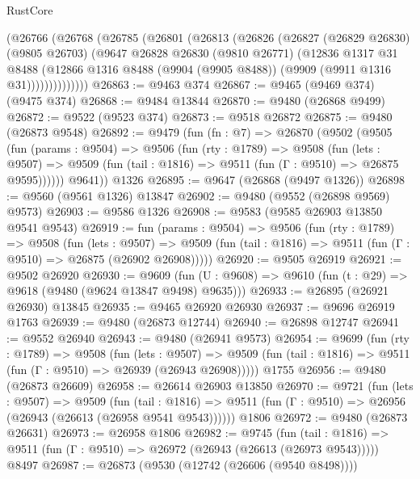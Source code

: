 \begin{lexlean}{RustCore}
\begin{coremodule}
        (@26766
          (@26768
            (@26785
              (@26801
                (@26813
                  (@26826
                    (@26827
                      (@26829 @26830)
                      (@9805 @26703)
                      (@9647
                        @26828
                        @26830
                        (@9810 @26771)
                        (@12836
                          @1317
                          @31
                          @8488
                          (@12866
                            @1316
                            @8488
                            (@9904 (@9905 @8488))
                            (@9909 (@9911 @1316 @31))))))))))))))
@26863 := @9463 @374
@26867 := @9465 (@9469 @374) (@9475 @374)
@26868 := @9484 @13844
@26870 := @9480 (@26868 @9499)
@26872 := @9522 (@9523 @374)
@26873 := @9518 @26872
@26875 := @9480 (@26873 @9548)
@26892 := @9479
    (fun (fn : @7) =>
    @26870
      (@9502
        (@9505
          (fun (params : @9504) =>
          @9506
            (fun (rty : @1789) =>
            @9508
              (fun (lets : @9507) =>
              @9509 (fun (tail : @1816) => @9511 (fun (Γ : @9510) => @26875 @9595))))))
        @9641))
    @1326
@26895 := @9647 (@26868 (@9497 @1326))
@26898 := @9560 (@9561 @1326) @13847
@26902 := @9480 (@9552 (@26898 @9569) @9573)
@26903 := @9586 @1326
@26908 := @9583 (@9585 @26903 @13850 @9541 @9543)
@26919 := fun (params : @9504) =>
  @9506
    (fun (rty : @1789) =>
    @9508
      (fun (lets : @9507) =>
      @9509 (fun (tail : @1816) => @9511 (fun (Γ : @9510) => @26875 (@26902 @26908)))))
@26920 := @9505 @26919
@26921 := @9502 @26920
@26930 := @9609
    (fun (U : @9608) => @9610 (fun (t : @29) => @9618 (@9480 (@9624 @13847 @9498) @9635)))
@26933 := @26895 (@26921 @26930) @13845
@26935 := @9465 @26920 @26930
@26937 := @9696 @26919 @1763
@26939 := @9480 (@26873 @12744)
@26940 := @26898 @12747
@26941 := @9552 @26940
@26943 := @9480 (@26941 @9573)
@26954 := @9699
    (fun (rty : @1789) =>
    @9508
      (fun (lets : @9507) =>
      @9509 (fun (tail : @1816) => @9511 (fun (Γ : @9510) => @26939 (@26943 @26908)))))
    @1755
@26956 := @9480 (@26873 @26609)
@26958 := @26614 @26903 @13850
@26970 := @9721
    (fun (lets : @9507) =>
    @9509
      (fun (tail : @1816) =>
      @9511 (fun (Γ : @9510) => @26956 (@26943 (@26613 (@26958 @9541 @9543))))))
    @1806
@26972 := @9480 (@26873 @26631)
@26973 := @26958 @1806
@26982 := @9745
    (fun (tail : @1816) => @9511 (fun (Γ : @9510) => @26972 (@26943 (@26613 (@26973 @9543)))))
    @8497
@26987 := @26873 (@9530 (@12742 (@26606 (@9540 @8498))))

\end{coremodule}
\end{lexlean}

